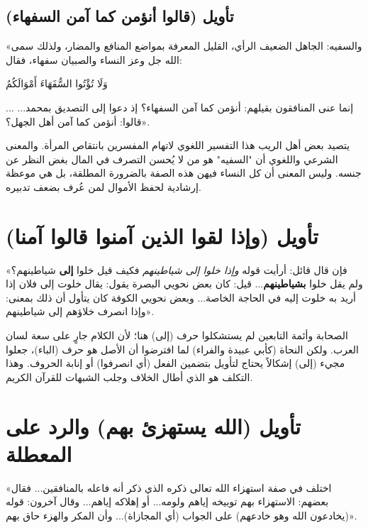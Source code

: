 \subsection{تأويل (قالوا أنؤمن كما آمن السفهاء)}
 «والسفيه: الجاهل الضعيف الرأي، القليل المعرفة بمواضع المنافع والمضار، ولذلك سمى الله جل وعز النساء والصبيان سفهاء، فقال: \begin{ayah}وَلَا تُؤْتُوا السُّفَهَاءَ أَمْوَالَكُمُ\end{ayah}... إنما عنى المنافقون بقيلهم: أنؤمن كما آمن السفهاء؟ إذ دعوا إلى التصديق بمحمد... قالوا: أنؤمن كما آمن أهل الجهل؟».

\begin{fawaid}
يتصيد بعض أهل الريب هذا التفسير اللغوي لاتهام المفسرين بانتقاص المرأة. والمعنى الشرعي واللغوي أن "السفيه" هو من لا يُحسن التصرف في المال بغض النظر عن جنسه. وليس المعنى أن كل النساء فيهن هذه الصفة بالضرورة المطلقة، بل هي موعظة إرشادية لحفظ الأموال لمن عُرف بضعف تدبيره.
\end{fawaid}

\separator

\section{تأويل (وإذا لقوا الذين آمنوا قالوا آمنا)}
 «فإن قال قائل: أرأيت قوله \textit{وإذا خلوا إلى شياطينهم} فكيف قيل خلوا \textbf{إلى} شياطينهم؟ ولم يقل خلوا \textbf{بشياطينهم}... قيل: كان بعض نحويي البصرة يقول: يقال خلوت إلى فلان إذا أريد به خلوت إليه في الحاجة الخاصة... وبعض نحويي الكوفة كان يتأول أن ذلك بمعنى: وإذا انصرف خلاؤهم إلى شياطينهم».

\begin{fawaid}
الصحابة وأئمة التابعين لم يستشكلوا حرف (إلى) هنا؛ لأن الكلام جارٍ على سعة لسان العرب. ولكن النحاة (كأبي عبيدة والفراء) لما افترضوا أن الأصل هو حرف (الباء)، جعلوا مجيء (إلى) إشكالاً يحتاج لتأويل بتضمين الفعل (أي انصرفوا) أو إنابة الحروف. وهذا التكلف هو الذي أطال الخلاف وجلب الشبهات للقرآن الكريم.
\end{fawaid}

\separator

\section{تأويل (الله يستهزئ بهم) والرد على المعطلة}
 «اختلف في صفة استهزاء الله تعالى ذكره الذي ذكر أنه فاعله بالمنافقين... فقال بعضهم: الاستهزاء بهم توبيخه إياهم ولومه... أو إهلاكه إياهم... وقال آخرون: قوله (يخادعون الله وهو خادعهم) على الجواب (أي المجازاة)... وأن المكر والهزء حاق بهم».

